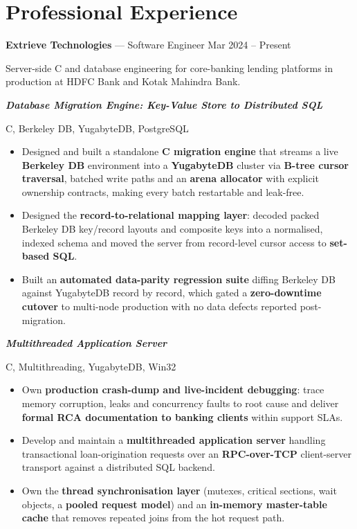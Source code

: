 \documentclass[10pt,a4paper]{article}
\newcommand{\role}[3]{\textbf{#1} --- #2 \hfill #3\par\vspace{0.15em}}
\newcommand{\project}[2]{\vspace{0.28em}\textit{\textbf{#1}}\par
  {\small\color{gray!80!black}#2}\par\vspace{-0.2em}}
\begin{document}
\section{Professional Experience}

\role{Extrieve Technologies}{Software Engineer}{Mar 2024 -- Present}
{\small Server-side C and database engineering for core-banking lending platforms in production at
HDFC Bank and Kotak Mahindra Bank.}

\project{Database Migration Engine: Key-Value Store to Distributed SQL}{C, Berkeley DB, YugabyteDB, PostgreSQL}
\begin{itemize}
  \item Designed and built a standalone \textbf{C migration engine} that streams a live
        \textbf{Berkeley DB} environment into a \textbf{YugabyteDB} cluster via \textbf{B-tree cursor
        traversal}, batched write paths and an \textbf{arena allocator} with explicit ownership
        contracts, making every batch restartable and leak-free.
  \item Designed the \textbf{record-to-relational mapping layer}: decoded packed Berkeley DB
        key/record layouts and composite keys into a normalised, indexed schema and moved the
        server from record-level cursor access to \textbf{set-based SQL}.
  \item Built an \textbf{automated data-parity regression suite} diffing Berkeley DB against
        YugabyteDB record by record, which gated a \textbf{zero-downtime cutover} to multi-node
        production with no data defects reported post-migration.
\end{itemize}

\project{Multithreaded Application Server}{C, Multithreading, YugabyteDB, Win32}
\begin{itemize}
  \item Own \textbf{production crash-dump and live-incident debugging}: trace memory corruption,
        leaks and concurrency faults to root cause and deliver \textbf{formal RCA documentation to
        banking clients} within support SLAs.
  \item Develop and maintain a \textbf{multithreaded application server} handling transactional
        loan-origination requests over an \textbf{RPC-over-TCP} client-server transport against a
        distributed SQL backend.
  \item Own the \textbf{thread synchronisation layer} (mutexes, critical sections, wait objects, a
        \textbf{pooled request model}) and an \textbf{in-memory master-table cache} that removes
        repeated joins from the hot request path.
\end{itemize}
\end{document}
